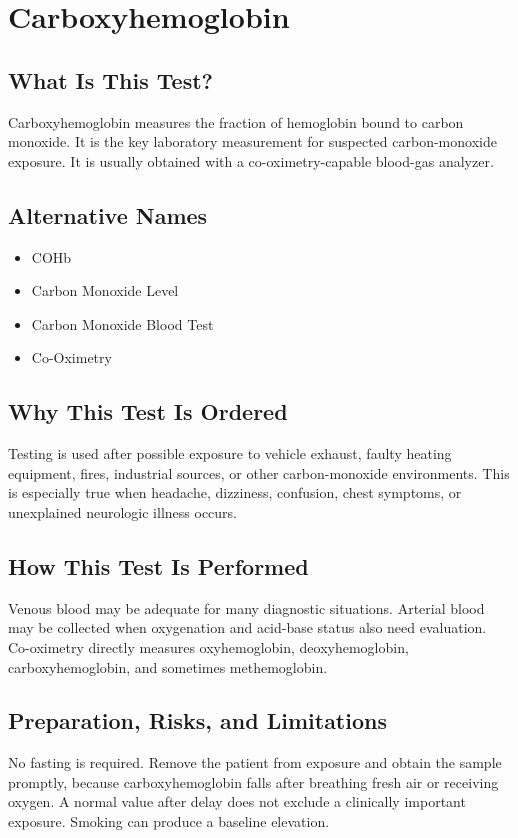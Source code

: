 \chapter{Carboxyhemoglobin}

\section*{What Is This Test?}
Carboxyhemoglobin measures the fraction of hemoglobin bound to carbon monoxide. It is the key laboratory measurement for suspected carbon-monoxide exposure. It is usually obtained with a co-oximetry-capable blood-gas analyzer.

\section*{Alternative Names}
\begin{itemize}
  \item COHb
  \item Carbon Monoxide Level
  \item Carbon Monoxide Blood Test
  \item Co-Oximetry
\end{itemize}
\section*{Why This Test Is Ordered}
Testing is used after possible exposure to vehicle exhaust, faulty heating equipment, fires, industrial sources, or other carbon-monoxide environments. This is especially true when headache, dizziness, confusion, chest symptoms, or unexplained neurologic illness occurs.

\section*{How This Test Is Performed}
Venous blood may be adequate for many diagnostic situations. Arterial blood may be collected when oxygenation and acid-base status also need evaluation. Co-oximetry directly measures oxyhemoglobin, deoxyhemoglobin, carboxyhemoglobin, and sometimes methemoglobin.

\section*{Preparation, Risks, and Limitations}
No fasting is required. Remove the patient from exposure and obtain the sample promptly, because carboxyhemoglobin falls after breathing fresh air or receiving oxygen. A normal value after delay does not exclude a clinically important exposure. Smoking can produce a baseline elevation.

